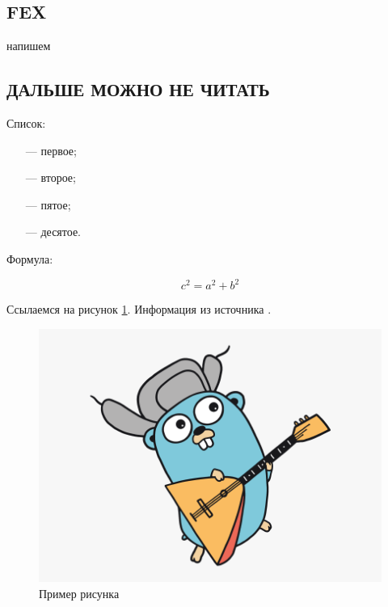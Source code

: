 \subsection{FEX}

напишем

\subsection{ДАЛЬШЕ МОЖНО НЕ ЧИТАТЬ}

Список:

\begin{itemize}[leftmargin=1.6\parindent]
	\item[---] первое;
	\item[---] второе;
	\item[---] пятое;
	\item[---] десятое.
\end{itemize}

Формула:

\begin{equation}
c^2 = a^2 + b^2
\end{equation}

Ссылаемся на рисунок \ref{fig:a1}. Информация из источника \cite{golang}.

\begin{figure}[hbtp]
	\centering
	\includegraphics[width=\textwidth]{img/golang.png}
	\caption{Пример рисунка}
	\label{fig:a1}
\end{figure}


\pagebreak